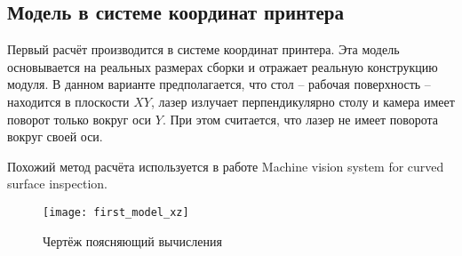         \subsection{Модель в системе координат принтера}
            Первый расчёт производится в системе координат принтера. Эта модель основывается на реальных размерах сборки и отражает реальную конструкцию модуля. В данном варианте предполагается, что стол -- рабочая поверхность -- находится в плоскости $ XY $, лазер излучает перпендикулярно столу и камера имеет поворот только вокруг оси $ Y $. При этом считается, что лазер не имеет поворота вокруг своей оси.

            Похожий метод расчёта используется в работе Machine vision system for curved surface inspection\cite{Lee2000}.

            \begin{figure}[!ht]\label{pic:first_model}
                \centering
                \texttt{[image: first\_model\_xz]}
                \caption{Чертёж поясняющий вычисления}
            \end{figure}
            
